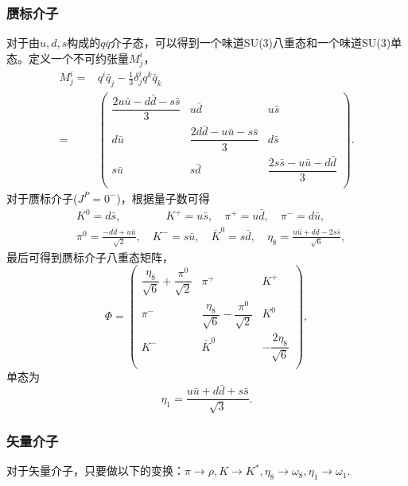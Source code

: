 \subsubsection{赝标介子}
对于由$u,d,s$构成的$q\bar{q}$介子态，可以得到一个味道SU(3)八重态和一个味道SU(3)单态。定义一个不可约张量$M^{i}_{j}$，\vspace{-0.4cm}
\begin{equation}
\begin{split}
	M^{i}_{j}=&q^{i}\bar{q}_{j}-\frac{1}{3}\delta^{i}_{j}q^{k}\bar{q}_{k}\\[2ex]
	=&
	\begin{pmatrix}
		\dfrac{2u\bar{u}-d\bar{d}-s\bar{s}}{3} & u\bar{d} & u\bar{s} \\
		d\bar{u} & \dfrac{2d\bar{d}-u\bar{u}-s\bar{s}}{3} & d\bar{s} \\
		s\bar{u} & s\bar{d} & \dfrac{2s\bar{s}-u\bar{u}-d\bar{d}}{3} \\
	\end{pmatrix}.
\end{split}
\end{equation}
对于赝标介子($J^{P}=0^{-}$)，根据量子数可得
\begin{equation}
\begin{split}
	&K^{0}=d\bar{s},\qquad\qquad K^{+}=u\bar{s},\quad \pi^{+}=u\bar{d},\quad\pi^{-}=d\bar{u},\\[2ex]
	&\pi^{0}=\frac{-d\bar{d}+u\bar{u}}{\sqrt{2}},\quad K^{-}=s\bar{u},\quad \bar{K}^{0}=s\bar{d},\quad \eta_{8}=\frac{u\bar{u}+d\bar{d}-2s\bar{s}}{\sqrt{6}},
\end{split}
\end{equation}
最后可得到赝标介子八重态矩阵，
\begin{equation}
\label{meson8}
	\Phi=
	\begin{pmatrix}
		\dfrac{\eta_{8}}{\sqrt{6}}+\dfrac{\pi^{0}}{\sqrt{2}} & \pi^{+} & K^{+}  \\
		\pi^{-} & \dfrac{\eta_{8}}{\sqrt{6}}-\dfrac{\pi^{0}}{\sqrt{2}} & K^{0} \\
		K^{-} & \bar{K}^{0} & -\dfrac{2\eta_{8}}{\sqrt{6}} \\
	\end{pmatrix},
\end{equation}
单态为
\begin{equation}
\label{meson1}
	\eta_{1}=\frac{u\bar{u}+d\bar{d}+s\bar{s}}{\sqrt{3}}.
\end{equation}
\subsubsection{矢量介子}
对于矢量介子，只要做以下的变换：$\pi\to\rho,K\to K^{*},\eta_{8}\to\omega_{8},\eta_{1}\to\omega_{1}$.
